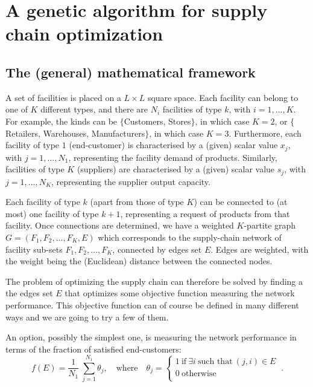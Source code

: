 \documentclass[12pt,titlepage]{article}
\author{}
\title{}
\begin{document}


\section*{A genetic algorithm for supply chain optimization}

\subsection*{The (general) mathematical framework}

A set of facilities is placed on a $L \times L$ square space. Each facility can belong to one of $K$ different types, and there are $N_i$ facilities of type $k$, with $i = 1, \ldots, K$. For example, the kinds can be $\lbrace$Customers, Stores$\rbrace$, in which case $K=2$, or $\lbrace$Retailers, Warehouses, Manufacturers$\rbrace$, in which case $K=3$.
Furthermore, each facility of type $1$ (end-customer) is characterised by a (given) scalar value $x_j$, with $j = 1, \ldots, N_1$, representing the facility demand of products. Similarly, facilities of type $K$ (suppliers) are characterised by a (given) scalar value $s_j$, with $j = 1, \ldots, N_K$, representing the supplier output capacity.

Each facility of type $k$ (apart from those of type $K$) can be connected to (at most) one facility of type $k+1$, representing a request of products from that facility. Once connections are determined, we have a weighted $K$-partite graph $G = (F_1, F_2, \ldots, F_K, E)$ which corresponds to the supply-chain network of facility sub-sets $F_1, F_2, \ldots, F_K$, connected by edges set $E$. Edges are weighted, with the weight being the (Euclidean) distance between the connected nodes.

The problem of optimizing the supply chain can therefore be solved by finding a the edges set $E$ that optimizes some objective function measuring the network performance. This objective function can of course be defined in many different ways and we are going to try a few of them. 

An option, possibly the simplest one, is measuring the network performance in terms of the fraction of satisfied end-customers:
\[
f(E) = \dfrac{1}{N_1} \ \sum_{j=1}^{N_1} \theta_j, \quad \mbox{where} \quad \theta_j = \begin{cases} 1 \ \mbox{if} \ \exists i \ \mbox{such that} \ (j,i) \in E \\ 0 \ \mbox{otherwise} \\ \end{cases} \ .
\]
\end{document}
